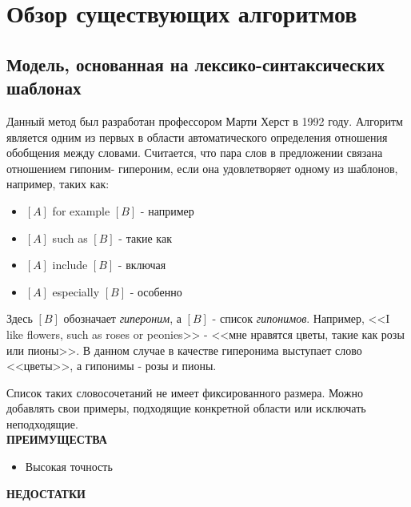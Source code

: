 \section{Обзор существующих алгоритмов}
\label{sec:Chapter_2} 
\large

\subsection{Модель, основанная на лексико-синтаксических шаблонах}

Данный метод был разработан профессором Марти Херст в 1992 году. Алгоритм является
одним из первых в области автоматического определения отношения обобщения между
словами. Считается, что пара слов в предложении связана отношением гипоним-
гипероним, если она удовлетворяет одному из шаблонов, например, таких как:

\begin{itemize}
\item $[A]$ for example $[B]$ - например
\item $[A]$ such as $[B]$ - такие как
\item $[A]$ include $[B]$ - включая
\item $[A]$ especially $[B]$ - особенно
\end{itemize}

Здесь $[B]$ обозначает \textit{гипероним}, а $[B]$ - список \textit{гипонимов}. Например, <<I like flowers, such as
roses or peonies>> - <<мне нравятся цветы, такие как розы или пионы>>. В данном случае в
качестве гиперонима выступает слово <<цветы>>, а гипонимы - розы и пионы.

Список таких словосочетаний не имеет фиксированного размера. Можно добавлять свои
примеры, подходящие конкретной области или исключать неподходящие.\\

\textbf{ПРЕИМУЩЕСТВА}

\begin{itemize}
\item Высокая точность
\end{itemize}

\textbf{НЕДОСТАТКИ}

